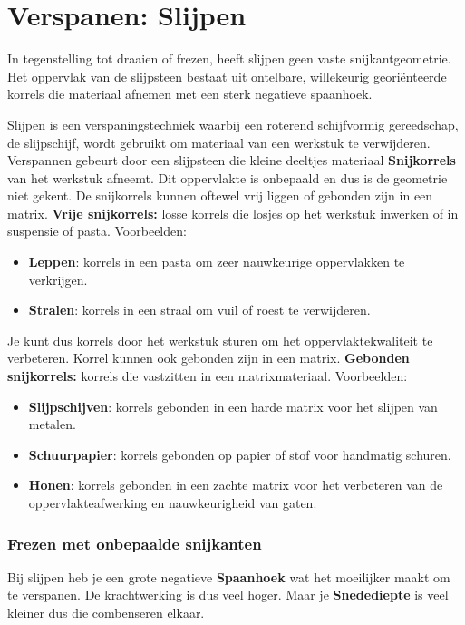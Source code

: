 \documentclass[a4paper,12pt,twoside]{report}
\begin{document}
\chapter{Verspanen: Slijpen}

\begin{conceptbox}[title=Onbepaalde snijkant]
    In tegenstelling tot draaien of frezen, heeft slijpen geen vaste snijkantgeometrie. Het oppervlak van de slijpsteen bestaat uit ontelbare, willekeurig georiënteerde korrels die materiaal afnemen met een sterk negatieve spaanhoek.
\end{conceptbox}

Slijpen is een verspaningstechniek waarbij een roterend schijfvormig gereedschap,
de slijpschijf, wordt gebruikt om materiaal van een werkstuk te verwijderen.
Verspannen gebeurt door een slijpsteen die kleine deeltjes materiaal \textbf{Snijkorrels} van het werkstuk afneemt.
Dit oppervlakte is onbepaald en dus is de geometrie niet gekent.
\newline
De snijkorrels kunnen oftewel vrij liggen of gebonden zijn in een matrix.
\newline
\textbf{Vrije snijkorrels:} losse korrels die losjes op het werkstuk inwerken of in suspensie of pasta. Voorbeelden:
\begin{itemize}
	\item \textbf{Leppen}: korrels in een pasta om zeer nauwkeurige oppervlakken te verkrijgen.
	\item \textbf{Stralen}: korrels in een straal om vuil of roest te verwijderen.
\end{itemize}
Je kunt dus korrels door het werkstuk sturen om het oppervlaktekwaliteit te verbeteren.
\newline
Korrel kunnen ook gebonden zijn in een matrix.
\newline
\textbf{Gebonden snijkorrels:} korrels die vastzitten in een matrixmateriaal. Voorbeelden:
\begin{itemize}
	\item \textbf{Slijpschijven}: korrels gebonden in een harde matrix voor het slijpen van metalen.
	\item \textbf{Schuurpapier}: korrels gebonden op papier of stof voor handmatig schuren.
	\item \textbf{Honen}: korrels gebonden in een zachte matrix voor het verbeteren van de oppervlakteafwerking en nauwkeurigheid van gaten.
\end{itemize}


\subsection{Frezen met onbepaalde snijkanten}
Bij slijpen heb je een grote negatieve \textbf{Spaanhoek} wat het moeilijker maakt om te verspanen.
De krachtwerking is dus veel hoger. Maar je \textbf{Snedediepte} is veel kleiner dus die combenseren elkaar.
\end{document}
